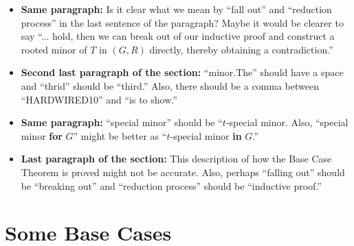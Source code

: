 \documentclass[11 pt]{article}
\theoremstyle{definition}
\theoremstyle{case}
\numberwithin{equation}{section}
\begin{document}
\begin{itemize}
\item \textbf{Same paragraph:} Is it clear what we mean by ``fall out'' and ``reduction process'' in the last sentence of the paragraph? Maybe it would be clearer to say ``... hold, then we can break out of our inductive proof and construct a rooted minor of $T$ in $(G,R)$ directly, thereby obtaining a contradiction.''
\item \textbf{Second last paragraph of the section:} ``minor.The'' should have a space and ``thrid'' should be ``third.'' Also, there should be a comma between ``HARDWIRED10'' and ``is to show.'' 
\item \textbf{Same paragraph:} ``special minor'' should be ``$t$-special minor. Also, ``special minor \textbf{for} $G$'' might be better as ``$t$-special minor \textbf{in} $G$.'' 
\item \textbf{Last paragraph of the section:} This description of how the Base Case Theorem is proved might not be accurate. Also, perhaps ``falling out'' should be ``breaking out'' and ``reduction process'' should be ``inductive proof.''
\end{itemize}

\section{Some Base Cases}
\end{document}
